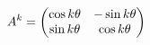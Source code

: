 \documentclass[preview]{standalone}
\begin{document}
\begin{align*}
\special{dvisvgm:raw <g id='unique000'>}A^k=\begin{pmatrix}\cos k\theta&-\sin k\theta\\\sin k\theta&\cos k\theta\end{pmatrix}\special{dvisvgm:raw </g>}
\end{align*}
\end{document}
